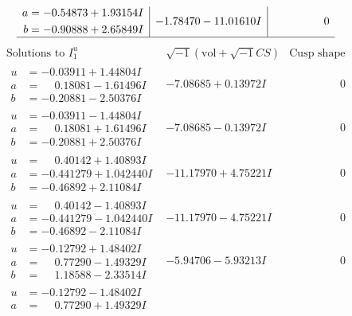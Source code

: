 \documentclass[1p]{elsarticle_modified}
\theoremstyle{definition}
\newcommand{\I}{\sqrt{-1}}
\begin{document}
$$\begin{array}{c|c|c}
\begin{aligned}
a &= -0.54873 + 1.93154 I \\
b &= -0.90888 + 2.65849 I\end{aligned}
 & -1.78470 - 11.01610 I & \phantom{-0.000000 } 0\\
 \hline 
 \end{array}$$\newpage$$\begin{array}{c|c|c}  
\text{Solutions to }I^u_{1}& \I (\text{vol} + \sqrt{-1}CS) & \text{Cusp shape}\\
 \hline 
\begin{aligned}
u &= -0.03911 + 1.44804 I \\
a &= \phantom{-}0.18081 - 1.61496 I \\
b &= -0.20881 - 2.50376 I\end{aligned}
 & -7.08685 + 0.13972 I & \phantom{-0.000000 } 0 \\ \hline\begin{aligned}
u &= -0.03911 - 1.44804 I \\
a &= \phantom{-}0.18081 + 1.61496 I \\
b &= -0.20881 + 2.50376 I\end{aligned}
 & -7.08685 - 0.13972 I & \phantom{-0.000000 } 0 \\ \hline\begin{aligned}
u &= \phantom{-}0.40142 + 1.40893 I \\
a &= -0.441279 + 1.042440 I \\
b &= -0.46892 + 2.11084 I\end{aligned}
 & -11.17970 + 4.75221 I & \phantom{-0.000000 } 0 \\ \hline\begin{aligned}
u &= \phantom{-}0.40142 - 1.40893 I \\
a &= -0.441279 - 1.042440 I \\
b &= -0.46892 - 2.11084 I\end{aligned}
 & -11.17970 - 4.75221 I & \phantom{-0.000000 } 0 \\ \hline\begin{aligned}
u &= -0.12792 + 1.48402 I \\
a &= \phantom{-}0.77290 - 1.49329 I \\
b &= \phantom{-}1.18588 - 2.33514 I\end{aligned}
 & -5.94706 - 5.93213 I & \phantom{-0.000000 } 0 \\ \hline\begin{aligned}
u &= -0.12792 - 1.48402 I \\
a &= \phantom{-}0.77290 + 1.49329 I \\

\end{aligned}
\end{array}$$
\end{document}
